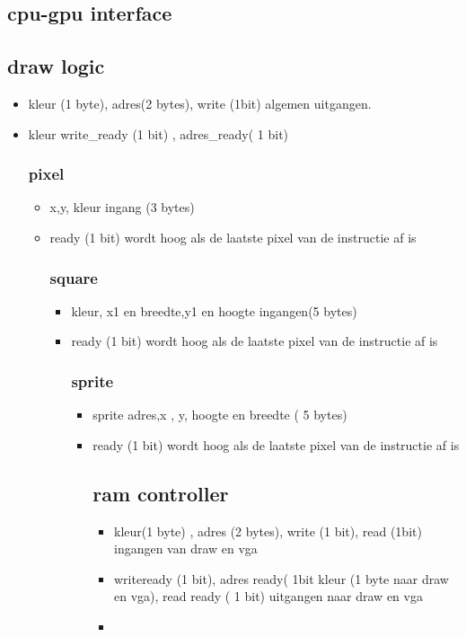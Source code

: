 \documentclass{scrartcl}
\begin{document}
\subsection { cpu-gpu interface}
\begin {itemize}

\subsection { draw logic}
\begin {itemize}
\item kleur (1 byte), adres(2 bytes), write (1bit) algemen uitgangen.
\item kleur write_ready (1 bit) , adres_ready( 1 bit)


\subsubsection { pixel}
\begin {itemize}
\item x,y, kleur ingang (3 bytes)
\item ready (1 bit) wordt hoog als de laatste pixel van de instructie af is


\subsubsection { square}
\begin {itemize}
\item kleur, x1 en breedte,y1 en hoogte ingangen(5 bytes)
\item ready (1 bit)  wordt hoog als de laatste pixel van de instructie af is

\subsubsection { sprite}
\begin {itemize}
\item sprite adres,x , y, hoogte en breedte ( 5 bytes)
\item ready (1 bit)  wordt hoog als de laatste pixel van de instructie af is


\subsection { ram controller}
\begin {itemize}
\item kleur(1 byte) , adres (2 bytes), write (1 bit), read (1bit) ingangen van draw en vga
\item writeready (1 bit), adres ready( 1bit  kleur (1 byte naar draw en vga), read ready ( 1 bit) uitgangen naar draw en vga
\item 





\end{itemize}
\end{itemize}
\end{itemize}
\end{itemize}
\end{itemize}
\end{itemize}
\end{document}
